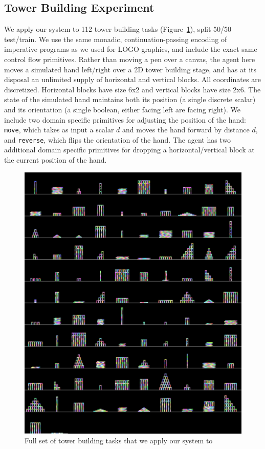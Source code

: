 \documentclass{article}
\newcommand{\code}[1]{{\footnotesize\texttt{#1}}}
\begin{document}
\subsection{Tower Building Experiment}
We apply our system to 112 tower building tasks (Figure~\ref{everyTowerTask}), split 50/50 test/train.
We use the same monadic, continuation-passing encoding of imperative programs as we used for LOGO graphics,
and include the exact same control flow primitives.
Rather than moving a pen over a canvas, the agent here moves a simulated hand left/right over a 2D tower building stage, and has at its disposal an unlimited supply of horizontal and vertical blocks.
All coordinates are discretized.
Horizontal blocks have size 6x2 and vertical blocks have size 2x6.
The state of the simulated hand maintains both its position (a single discrete scalar) and its orientation (a single boolean, either facing left are facing right).
We include two domain specific primitives for adjusting the position of the hand: \code{move}, which takes as input a scalar $d$ and moves the hand forward  by distance $d$,
and \code{reverse},
which flips the orientation of the hand.
The agent has two additional domain specific primitives for dropping a horizontal/vertical block at the current position of the hand.


\begin{figure}
  \includegraphics[width = \textwidth]{figures/fullTower.png}
  \caption{Full set of tower building tasks that we apply our system to}\label{everyTowerTask}
\end{figure}
\end{document}
